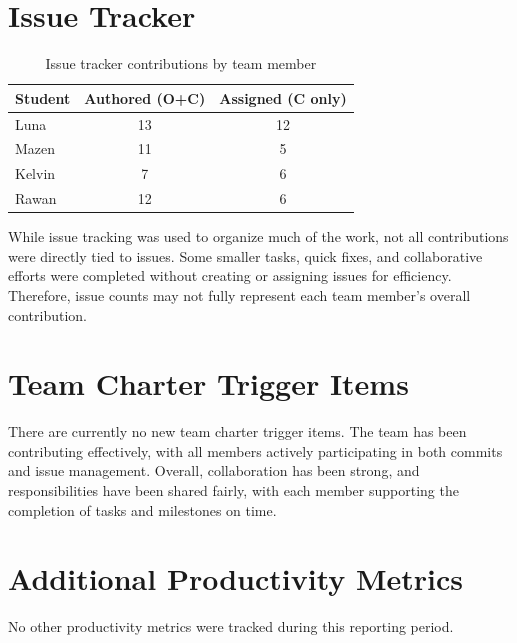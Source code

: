 \documentclass{article}
\begin{document}
\section{Issue Tracker}


\begin{table}[H]
\centering
\begin{tabular}{lcc}
\toprule
\textbf{Student} & \textbf{Authored (O+C)} & \textbf{Assigned (C only)}\\
\midrule
Luna   & 13 & 12 \\
Mazen  & 11 & 5  \\
Kelvin & 7  & 6  \\
Rawan  & 12 & 6  \\
\bottomrule
\end{tabular}
\caption{Issue tracker contributions by team member}
\end{table}

While issue tracking was used to organize much of the work, not all contributions were directly tied to issues. Some smaller tasks, quick fixes, and collaborative efforts were completed without creating or assigning issues for efficiency. Therefore, issue counts may not fully represent each team member’s overall contribution.
\section{Team Charter Trigger Items}

There are currently no new team charter trigger items. The team has been contributing effectively, with all members actively participating in both commits and issue management. Overall, collaboration has been strong, and responsibilities have been shared fairly, with each member supporting the completion of tasks and milestones on time.

\section{Additional Productivity Metrics}

No other productivity metrics were tracked during this reporting period.
\end{document}
